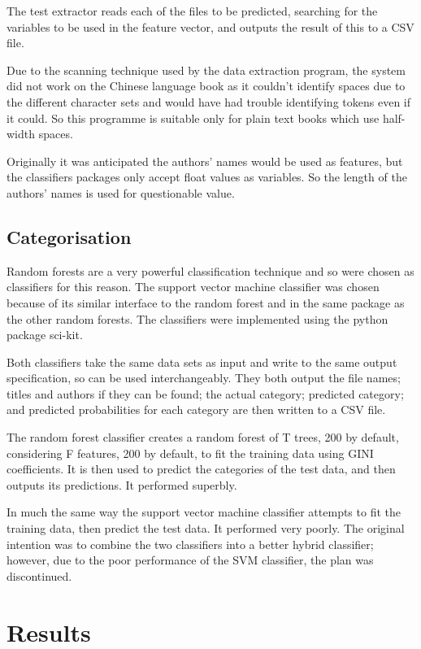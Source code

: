 \documentclass[11pt]{article}
\begin{document}
The test extractor reads each of the files to be predicted, searching for the
variables to be used in the feature vector, and outputs the result of this to a
CSV file.

Due to the scanning technique used by the data extraction program, the system
did not work on the Chinese language book as it couldn't identify spaces due to
the different character sets and would have had trouble identifying tokens even
if it could. So this programme is suitable only for plain text books which use
half-width spaces.

Originally it was anticipated the authors' names would be used as features, but
the classifiers packages only accept float values as variables. So the length of
the authors' names is used for questionable value.

\subsection{Categorisation}

Random forests are a very powerful classification technique and so were chosen
as classifiers for this reason. The support vector machine classifier was chosen
because of its similar interface to the random forest and in the same package as
the other random forests. The classifiers were implemented using the python
package sci-kit.

Both classifiers take the same data sets as input and write to the same output
specification, so can be used interchangeably. They both output the file names;
titles and authors if they can be found; the actual category; predicted
category; and predicted probabilities for each category are then written to a
CSV file.

The random forest classifier creates a random forest of T trees, 200 by
default, considering F features, 200 by default, to fit the training data using
GINI coefficients. It is then used to predict the categories of the test data,
and then outputs its predictions. It performed superbly.

In much the same way the support vector machine classifier attempts to fit the
training data, then predict the test data. It performed very poorly. The
original intention was to combine the two classifiers into a better hybrid
classifier; however, due to the poor performance of the SVM classifier, the plan
was discontinued.

\section{Results}
\end{document}
